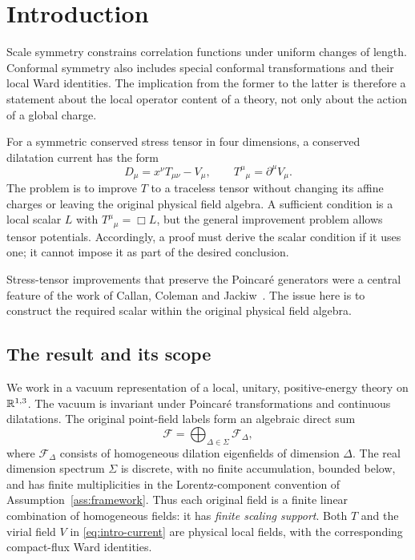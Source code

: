 \section{Introduction}
\label{sec:introduction}

Scale symmetry constrains correlation functions under uniform changes of length. Conformal symmetry also includes special conformal transformations and their local Ward identities. The implication from the former to the latter is therefore a statement about the local operator content of a theory, not only about the action of a global charge.

For a symmetric conserved stress tensor in four dimensions, a conserved dilatation current has the form
\begin{equation}\label{eq:intro-current}
 D_\mu=x^\nu T_{\mu\nu}-V_\mu,
 \qquad T^\mu{}_{\mu}=\partial^\mu V_\mu.
\end{equation}
The problem is to improve $T$ to a traceless tensor without changing its affine charges or leaving the original physical field algebra. A sufficient condition is a local scalar $L$ with $T^\mu{}_{\mu}=\Box L$, but the general improvement problem allows tensor potentials. Accordingly, a proof must derive the scalar condition if it uses one; it cannot impose it as part of the desired conclusion.

Stress-tensor improvements that preserve the Poincar\'e generators were a central feature of the work of Callan, Coleman and Jackiw~\cite{CallanColemanJackiw1970}. The issue here is to construct the required scalar within the original physical field algebra.

\subsection{The result and its scope}

We work in a vacuum representation of a local, unitary, positive-energy
theory on $\mathbb R^{1,3}$. The vacuum is invariant under Poincar\'e
transformations and continuous dilatations. The original point-field
labels form an algebraic direct sum
\[
 \mathcal F=\bigoplus_{\Delta\in\Sigma}\mathcal F_\Delta,
\]
where $\mathcal F_\Delta$ consists of homogeneous dilation eigenfields
of dimension $\Delta$. The real dimension spectrum $\Sigma$ is discrete,
with no finite accumulation, bounded below, and has finite multiplicities
in the Lorentz-component convention of Assumption~\ref{ass:framework}.
Thus each original field is a finite linear combination of homogeneous
fields: it has \emph{finite scaling support}. Both $T$ and the virial field
$V$ in \eqref{eq:intro-current} are physical local fields, with the
corresponding compact-flux Ward identities.

